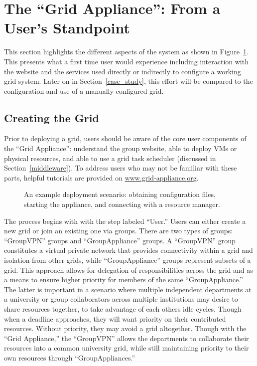 \documentclass[conference]{IEEEtran}
\begin{document}
\section{The ``Grid Appliance'': From a User's Standpoint}
\label{system}

This section highlights the different aspects of the system as shown in
Figure~\ref{fig:system}.  This presents what a first time user would experience
including interaction with the website and the services used directly or
indirectly to configure a working grid system.  Later on in
Section~\ref{case_study}, this effort will be compared to the configuration and
use of a manually configured grid.

\subsection{Creating the Grid}

Prior to deploying a grid, users should be aware of the core user components of
the ``Grid Appliance'': understand the group website, able to deploy VMs or
physical resources, and able to use a grid task scheduler (discussed in
Section~\ref{middleware}).  To address users who may not be familiar with these
parts, helpful tutorials are provided on \url{www.grid-appliance.org}.  

\begin{figure}[ht]
\centering
{}
\caption{An example deployment scenario:  obtaining configuration files,
starting the appliance, and connecting with a resource manager.}
\label{fig:system}
\end{figure}

The process begins with with the step labeled ``User.'' Users can either create
a new grid or join an existing one via groups.  There are two types of groups:
``GroupVPN'' groups and ``GroupAppliance'' groups. A ``GroupVPN'' group
constitutes a virtual private network that provides connectivity within a grid
and isolation from other grids, while ``GroupAppliance'' groups represent
subsets of a grid.  This approach allows for delegation of responsibilities
across the grid and as a means to ensure higher priority for members of the
same ``GroupAppliance.'' The latter is important in a scenario where multiple
independent departments at a university or group collaborators across multiple
institutions may desire to share resources together, to take advantage of each
others idle cycles.  Though when a deadline approaches, they will want priority
on their contributed resources.  Without priority, they may avoid a grid
altogether.  Though with the ``Grid Appliance,'' the ``GroupVPN'' allows the
departments to collaborate their resources into a common university grid, while
still maintaining priority to their own resources through ``GroupAppliances.''
\end{document}
